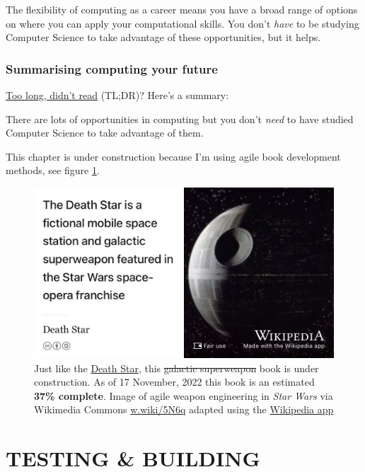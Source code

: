 \documentclass[
]{book}
\begin{document}
The flexibility of computing as a career means you have a broad range of options on where you can apply your computational skills. You don't \emph{have} to be studying Computer Science to take advantage of these opportunities, but it helps.

\hypertarget{tldr6}{%
\section{Summarising computing your future}\label{tldr6}}

\href{https://en.wiktionary.org/wiki/too_long;_didn\%27t_read}{Too long, didn't read} (TL;DR)? Here's a summary:

There are lots of opportunities in computing but you don't \emph{need} to have studied Computer Science to take advantage of them.

This chapter is under construction because I'm using agile book development methods, see figure \ref{fig:deathstar3-fig}.

\begin{figure}

{\centering \includegraphics[width=0.99\linewidth]{images/DeathStar2} 

}

\caption{Just like the \href{https://en.wikipedia.org/wiki/Death_Star}{Death Star}, this \sout{galactic superweapon} book is under construction. As of 17 November, 2022 this book is an estimated \textbf{37\% complete}. Image of agile weapon engineering in \emph{Star Wars} via Wikimedia Commons \href{https://w.wiki/5N6q}{w.wiki/5N6q} adapted using the \href{https://apps.apple.com/gb/app/wikipedia/id324715238}{Wikipedia app}}\label{fig:deathstar3-fig}
\end{figure}

\hypertarget{part-testing-building}{%
\part{TESTING \& BUILDING}\label{part-testing-building}}
\end{document}
